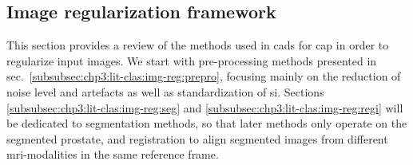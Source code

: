 \subsection{Image regularization framework}\label{subsec:chp3:lit-clas:img-reg}

This section provides a review of the methods used in \acp{cad} for \ac{cap} in order to regularize input images.
We start with pre-processing methods presented in \acs{sec}.~\ref{subsubsec:chp3:lit-clas:img-reg:prepro}, focusing mainly on the reduction of noise level and artefacts as well as standardization of \ac{si}.
Sections \ref{subsubsec:chp3:lit-clas:img-reg:seg} and \ref{subsubsec:chp3:lit-clas:img-reg:regi} will be dedicated to segmentation methods, so that later methods only operate on the segmented prostate, and registration to align segmented images from different \ac{mri}-modalities in the same reference frame.




